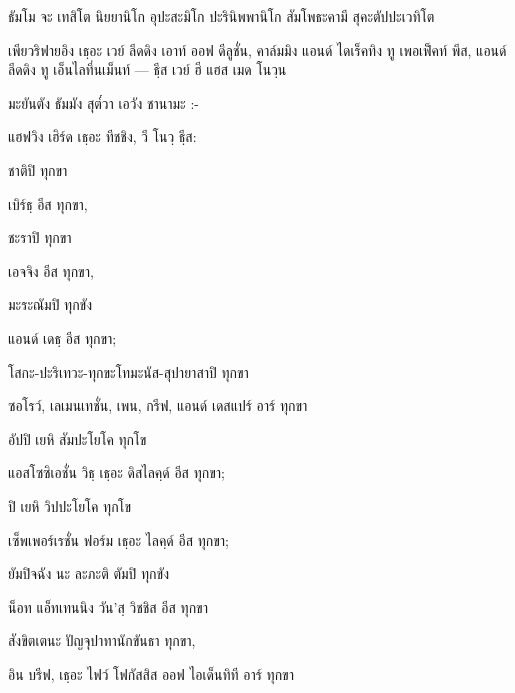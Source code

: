 ธัมโม จะ เทสิโต นิยยานิโก อุปะสะมิโก ปะรินิพพานิโก สัมโพธะคามี สุคะตัปปะเวทิโต

\begin{english}
เพียวริฟายอิง เธฺอะ เวย์ ลีดดิง เอาท์ ออฟ ดีลูชั่น, คาล์มมิง แอนด์ ไดเร็คทิง ทู เพอเฟ็คท์ พีส, แอนด์ ลีดดิง ทู เอ็นไลทึ่นเม็นท์ — ธฺีส เวย์ ฮี แฮส เมด โนวฺน
\end{english}

มะยันตัง ธัมมัง สุต๎วา เอวัง ชานามะ :-

\begin{english}
แฮฟวิง เฮิร์ด เธฺอะ ทีชชิง, วี โนวฺ ธฺีส:
\end{english}

ชาติปิ ทุกขา

\begin{english}
เบิร์ธฺ อีส ทุกขา,
\end{english}

ชะราปิ ทุกขา

\begin{english}
เอจจิง อีส ทุกขา,
\end{english}

มะระณัมปิ ทุกขัง

\begin{english}
แอนด์ เดธฺ อีส ทุกขา;
\end{english}

โสกะ-ปะริเทวะ-ทุกขะโทมะนัส-สุปายาสาปิ ทุกขา

\begin{english}
ซอโรว์, เลเมนเทชั่น, เพน, กรีฟ, แอนด์ เดสแปร์ อาร์ ทุกขา
\end{english}

อัปปิ เยหิ สัมปะโยโค ทุกโข

\begin{english}
แอสโซซิเอชั่น วิธฺ เธฺอะ ดิสไลคฺด์ อีส ทุกขา;
\end{english}

ปิ เยหิ วิปปะโยโค ทุกโข
\begin{english}
เซ็พเพอร์เรชั่น ฟอร์ม เธฺอะ ไลคฺด์ อีส ทุกขา;
\end{english}

ยัมปิจฉัง นะ ละภะติ ตัมปิ ทุกขัง

\begin{english}
น็อท แอ็ทเทนนิง วัน’สฺ วิชชิส อีส ทุกขา
\end{english}

สังขิตเตนะ ปัญจุปาทานักขันธา ทุกขา,

\begin{english}
อิน บรีฟ, เธฺอะ ไฟว์ โฟกัสสิส ออฟ ไอเด็นทิที อาร์ ทุกขา
\end{english}

